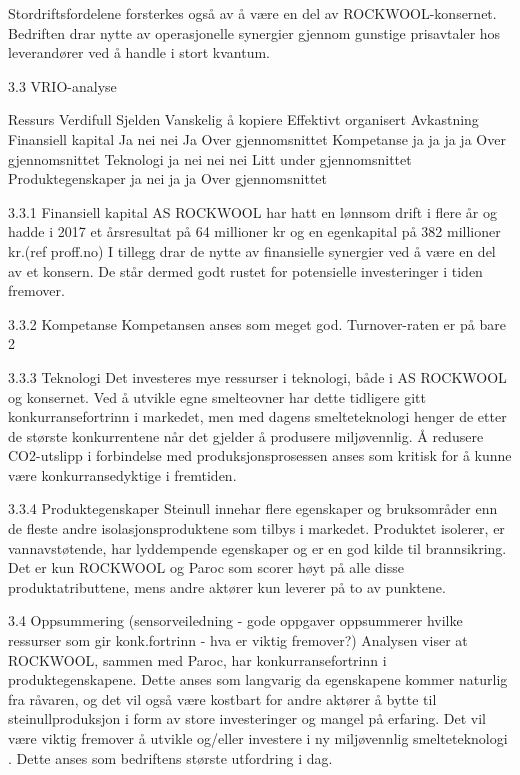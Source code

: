Stordriftsfordelene forsterkes også av å være en del av ROCKWOOL-konsernet. Bedriften drar nytte av operasjonelle synergier gjennom gunstige prisavtaler hos leverandører ved å handle i stort kvantum.

3.3 VRIO-analyse

Ressurs
Verdifull
Sjelden
Vanskelig å kopiere
Effektivt organisert
Avkastning
Finansiell kapital
Ja
nei
nei
Ja
Over gjennomsnittet
Kompetanse
ja
ja
ja
ja
Over gjennomsnittet
Teknologi
ja
nei
nei
nei
Litt under gjennomsnittet
Produktegenskaper
ja
nei
ja
ja
Over gjennomsnittet

3.3.1 Finansiell kapital
AS ROCKWOOL har hatt en lønnsom drift i flere år og hadde i 2017 et årsresultat på 64 millioner kr og en egenkapital på 382 millioner kr.(ref proff.no) I tillegg drar de nytte av finansielle synergier ved å være en del av et konsern. De står dermed godt rustet for potensielle investeringer i tiden fremover.

3.3.2 Kompetanse
Kompetansen anses som meget god. Turnover-raten er på bare 2%

3.3.3 Teknologi
Det investeres mye ressurser i teknologi, både i AS ROCKWOOL og konsernet. Ved å utvikle egne smelteovner har dette tidligere gitt konkurransefortrinn i markedet, men med dagens smelteteknologi henger de etter de største konkurrentene når det gjelder å produsere miljøvennlig. Å redusere CO2-utslipp i forbindelse med produksjonsprosessen anses som kritisk for å kunne være konkurransedyktige i fremtiden.

3.3.4 Produktegenskaper
Steinull innehar flere egenskaper og bruksområder enn de fleste andre isolasjonsproduktene som tilbys i markedet. Produktet isolerer, er vannavstøtende, har lyddempende egenskaper og er en god kilde til brannsikring. Det er kun ROCKWOOL og Paroc som scorer høyt på alle disse produktatributtene, mens andre aktører kun leverer på to av punktene.  

3.4 Oppsummering (sensorveiledning - gode oppgaver oppsummerer hvilke ressurser som gir konk.fortrinn - hva er viktig fremover?)
Analysen viser at ROCKWOOL, sammen med Paroc, har konkurransefortrinn i produktegenskapene. Dette anses som langvarig da egenskapene kommer naturlig fra råvaren, og det vil også være kostbart for andre aktører å bytte til steinullproduksjon i form av store investeringer og mangel på erfaring. Det vil være viktig fremover å utvikle og/eller investere i ny miljøvennlig smelteteknologi . Dette anses som bedriftens største utfordring i dag.

